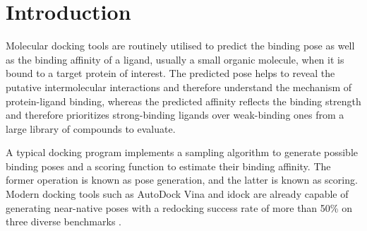\documentclass[twocolumn]{bmcart}
\begin{document}


\section*{Introduction}

Molecular docking tools are routinely utilised to predict the binding pose as well as the binding affinity of a ligand, usually a small organic molecule, when it is bound to a target protein of interest. The predicted pose helps to reveal the putative intermolecular interactions and therefore understand the mechanism of protein-ligand binding, whereas the predicted affinity reflects the binding strength and therefore prioritizes strong-binding ligands over weak-binding ones from a large library of compounds to evaluate.

A typical docking program implements a sampling algorithm to generate possible binding poses and a scoring function to estimate their binding affinity. The former operation is known as pose generation, and the latter is known as scoring. Modern docking tools such as AutoDock Vina \cite{595} and idock \cite{1362} are already capable of generating near-native poses with a redocking success rate of more than 50\% on three diverse benchmarks \cite{1362}.
\end{document}
